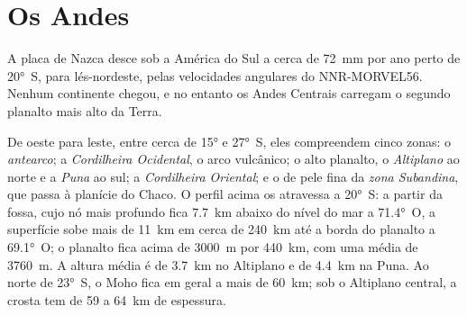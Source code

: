 \section{Os Andes}\label{sec:b2:himalaya-andes:andes}

A placa de Nazca desce sob a América do Sul a cerca de \qty{72}{mm} por ano perto de
\ang{20}~S, para lés-nordeste, pelas velocidades angulares do NNR-MORVEL56. Nenhum continente
chegou, e no entanto os Andes Centrais carregam o segundo planalto mais alto da Terra.

De oeste para leste, entre cerca de \ang{15} e \ang{27}~S, eles compreendem cinco zonas: o
\emph{antearco}; a \emph{Cordilheira Ocidental}, o arco vulcânico; o alto planalto, o
\emph{Altiplano} ao norte e a \emph{Puna} ao sul; a \emph{Cordilheira
Oriental}; e o  de pele fina da \emph{zona Subandina}, que
passa à planície do Chaco. O perfil acima os atravessa a \ang{20}~S: a partir da fossa,
cujo nó mais profundo fica \qty{7.7}{km} abaixo do nível do mar a \ang{71.4}~O, a superfície sobe
mais de \qty{11}{km} em cerca de \qty{240}{km} até a borda do planalto a \ang{69.1}~O;
o planalto fica acima de \qty{3000}{m} por \qty{440}{km}, com uma
média de \qty{3760}{m}. A altura média é de \qty{3.7}{km} no Altiplano e de \qty{4.4}{km} na
Puna. Ao norte de \ang{23}~S, o Moho fica em geral a mais de \qty{60}{km}; sob o
Altiplano central, a crosta tem de 59 a \qty{64}{km} de espessura.

